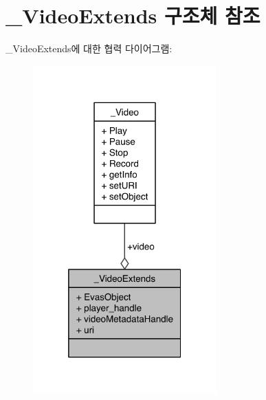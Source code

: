 \hypertarget{struct___video_extends}{\section{\-\_\-\-Video\-Extends 구조체 참조}
\label{struct___video_extends}
}


\-\_\-\-Video\-Extends에 대한 협력 다이어그램\-:\nopagebreak
\begin{figure}[H]
\begin{center}
\leavevmode
\includegraphics[width=200pt]{struct___video_extends__coll__graph}
\end{center}
\end{figure}
